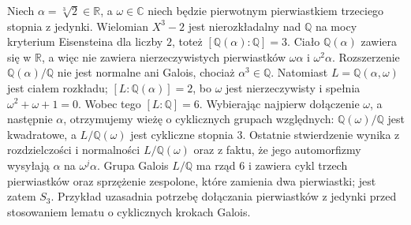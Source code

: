 \begin{przyklad}
\label{aa:prz:radicals-not-galois-step}
Niech $\alpha=\sqrt[3]{2}\in\mathbb R$, a $\omega\in\mathbb C$
niech będzie pierwotnym pierwiastkiem trzeciego stopnia z jedynki.
Wielomian $X^3-2$ jest nierozkładalny nad $\mathbb Q$
na mocy kryterium Eisensteina dla liczby $2$, toteż
$[\mathbb Q(\alpha):\mathbb Q]=3$. Ciało
$\mathbb Q(\alpha)$ zawiera się w $\mathbb R$, a więc
nie zawiera nierzeczywistych pierwiastków $\omega\alpha$
i $\omega^2\alpha$. Rozszerzenie $\mathbb Q(\alpha)/\mathbb Q$
nie jest normalne ani Galois, chociaż $\alpha^3\in\mathbb Q$.
Natomiast $L=\mathbb Q(\alpha,\omega)$ jest ciałem rozkładu;
$[L:\mathbb Q(\alpha)]=2$, bo $\omega$ jest nierzeczywisty
i spełnia $\omega^2+\omega+1=0$. Wobec tego $[L:\mathbb Q]=6$.
Wybierając najpierw dołączenie $\omega$, a następnie $\alpha$,
otrzymujemy wieżę o cyklicznych grupach względnych:
$\mathbb Q(\omega)/\mathbb Q$ jest kwadratowe,
a $L/\mathbb Q(\omega)$ jest cykliczne stopnia $3$.
Ostatnie stwierdzenie wynika z rozdzielczości i normalności
$L/\mathbb Q(\omega)$ oraz z faktu, że jego automorfizmy
wysyłają $\alpha$ na $\omega^j\alpha$.
Grupa Galois $L/\mathbb Q$ ma rząd $6$ i zawiera
cykl trzech pierwiastków oraz sprzężenie zespolone,
które zamienia dwa pierwiastki; jest zatem $S_3$.
Przykład uzasadnia potrzebę dołączania pierwiastków z jedynki
przed stosowaniem lematu o cyklicznych krokach Galois.
\end{przyklad}

